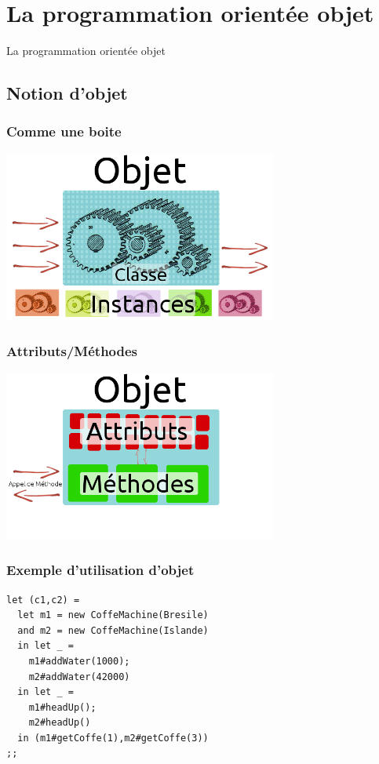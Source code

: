 \section{La programmation orientée objet}
\begin{frame}
	\begin{center}
	\huge
	La programmation orientée objet
	\end{center}
\end{frame}

\subsection{Notion d'objet} %
\begin{frame}
	\frametitle{Comme une boite}
	\begin{center}
	\includegraphics[width=9cm]{pics/explObj1.png}
	\end{center}
\end{frame}
\begin{frame}
	\frametitle{Attributs/Méthodes}
	\begin{center}
	\includegraphics[width=9cm]{pics/explObj2.png}
	\end{center}
\end{frame}
\begin{frame}[fragile]
	\frametitle{Exemple d'utilisation d'objet}
	\begin{lstlisting}
let (c1,c2) =
  let m1 = new CoffeMachine(Bresile)
  and m2 = new CoffeMachine(Islande)
  in let _ = 
    m1#addWater(1000);
    m2#addWater(42000)
  in let _ =
    m1#headUp();
    m2#headUp()
  in (m1#getCoffe(1),m2#getCoffe(3))
;;
	\end{lstlisting}
\end{frame}

